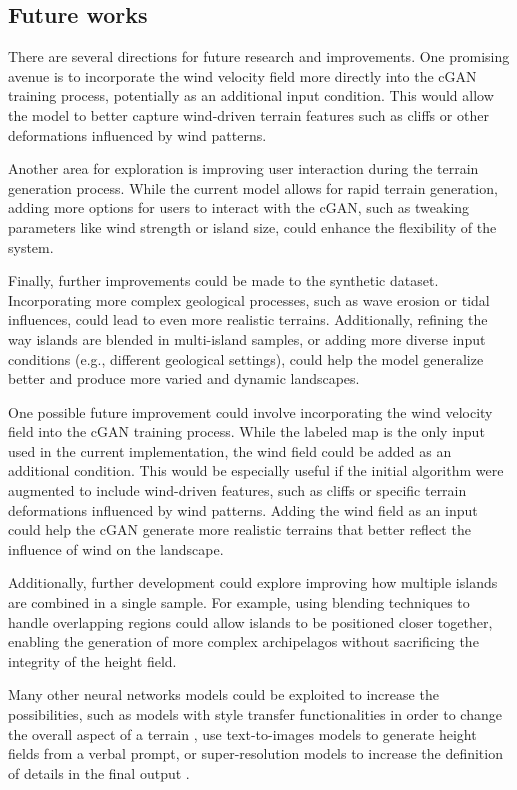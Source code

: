 \subsection{Future works}

There are several directions for future research and improvements. One promising avenue is to incorporate the wind velocity field more directly into the cGAN training process, potentially as an additional input condition. This would allow the model to better capture wind-driven terrain features such as cliffs or other deformations influenced by wind patterns.

Another area for exploration is improving user interaction during the terrain generation process. While the current model allows for rapid terrain generation, adding more options for users to interact with the cGAN, such as tweaking parameters like wind strength or island size, could enhance the flexibility of the system.

Finally, further improvements could be made to the synthetic dataset. Incorporating more complex geological processes, such as wave erosion or tidal influences, could lead to even more realistic terrains. Additionally, refining the way islands are blended in multi-island samples, or adding more diverse input conditions (e.g., different geological settings), could help the model generalize better and produce more varied and dynamic landscapes.


One possible future improvement could involve incorporating the wind velocity field into the cGAN training process. While the labeled map is the only input used in the current implementation, the wind field could be added as an additional condition. This would be especially useful if the initial algorithm were augmented to include wind-driven features, such as cliffs or specific terrain deformations influenced by wind patterns. Adding the wind field as an input could help the cGAN generate more realistic terrains that better reflect the influence of wind on the landscape.

Additionally, further development could explore improving how multiple islands are combined in a single sample. For example, using blending techniques to handle overlapping regions could allow islands to be positioned closer together, enabling the generation of more complex archipelagos without sacrificing the integrity of the height field.

Many other neural networks models could be exploited to increase the possibilities, such as models with style transfer functionalities \cite{Gatys2015,Zhu2020} in order to change the overall aspect of a terrain \cite{Perche2023a,Perche2023b}, use text-to-images models \cite{Rombach2021,Radford2021} to generate height fields from a verbal prompt, or super-resolution models \cite{Dong2014} to increase the definition of details in the final output \cite{Guerin2016a}.
